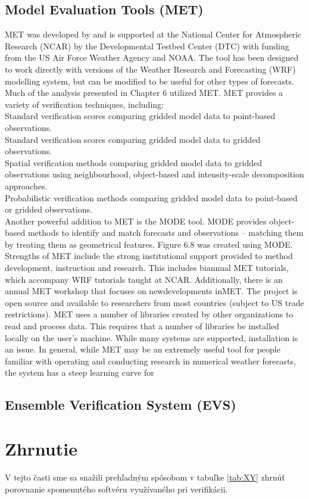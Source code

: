\subsection[MET]{Model Evaluation Tools (MET)}
MET was developed by and is supported at the National Center for Atmospheric Research (NCAR) by the Developmental Testbed Center (DTC) with funding from the US Air Force Weather Agency and NOAA. The tool has been designed to work directly with versions of the Weather Research and Forecasting (WRF) modelling system, but can be modified to be useful for other types of forecasts. Much of the analysis presented in Chapter 6 utilized MET. MET provides a variety of verification techniques, including:\\
 
 Standard verification scores comparing gridded model data to point-based observations. \\
 Standard verification scores comparing gridded model data to gridded observations. \\
 Spatial verification methods comparing gridded model data to gridded observations using neighbourhood, object-based and intensity-scale decomposition approaches. \\
 Probabilistic verification methods comparing gridded model data to point-based or gridded observations. \\
 
Another powerful addition to MET is the MODE tool. MODE provides object-based methods to identify and match forecasts and observations – matching them by treating them as geometrical features. Figure 6.8 was created using MODE. Strengths of MET include the strong institutional support provided to method development, instruction and research. This includes biannual MET tutorials, which accompany WRF tutorials taught at NCAR. Additionally, there is an annual MET workshop that focuses on newdevelopments inMET. The project is open source and available to researchers from most countries (subject to US trade restrictions). MET uses a number of libraries created by other organizations to read and process data. This requires that a number of libraries be installed locally on the user’s machine. While many systems are supported, installation is an issue. In general, while MET may be an extremely useful tool for people familiar with operating and conducting research in numerical weather forecasts, the system has a steep learning curve for

\subsection[EVS]{Ensemble Verification System (EVS)}


\section{Zhrnutie}
V tejto časti sme sa snažili prehľadným spôsobom v tabuľke \ref{tab:XY} zhrnúť porovnanie spomenutého softvéru využívaného pri verifikácii.
